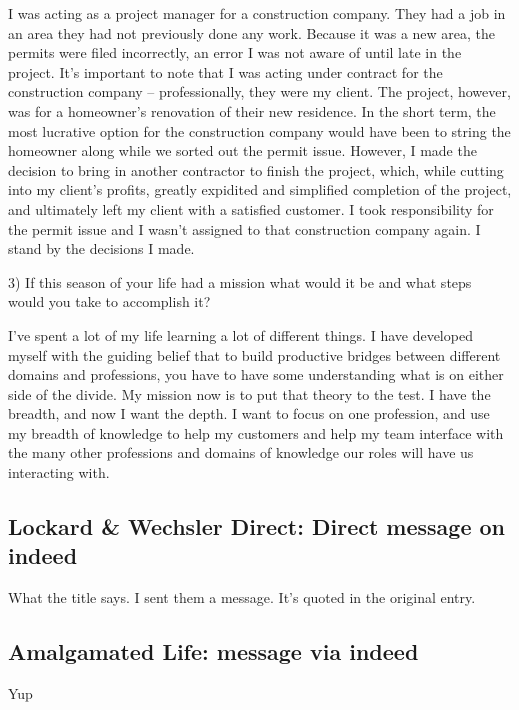\documentclass[
	letterpaper, %
	12pt, %
]{CSSullivanBusinessReport}
\begin{document}
I was acting as a project manager for a construction company. They had a job in an area they had not previously done any work. Because it was a new area, the permits were filed incorrectly, an error I was not aware of until late in the project. It's important to note that I was acting under contract for the construction company -- professionally, they were my client. The project, however, was for a homeowner's renovation of their new residence. In the short term, the most lucrative option for the construction company would have been to string the homeowner along while we sorted out the permit issue. However, I made the decision to bring in another contractor to finish the project, which, while cutting into my client's profits, greatly expidited and simplified completion of the project, and ultimately left my client with a satisfied customer. I took responsibility for the permit issue and I wasn't assigned to that construction company again. I stand by the decisions I made. 

3) If this season of your life had a mission what would it be and what steps would you take to accomplish it?

I've spent a lot of my life learning a lot of different things. I have developed myself with the guiding belief that to build productive bridges between different domains and professions, you have to have some understanding what is on either side of the divide. My mission now is to put that theory to the test. I have the breadth, and now I want the depth. I want to focus on one profession, and use my breadth of knowledge to help my customers and help my team interface with the many other professions and domains of knowledge our roles will have us interacting with. 


\subsection[Lockard \& Wechsler Direct]{Lockard \& Wechsler Direct: Direct message on indeed}

What the title says. I sent them a message. It's quoted in the original entry.


\subsection[Amalgamated Life]{Amalgamated Life: message via indeed}

Yup
\end{document}
